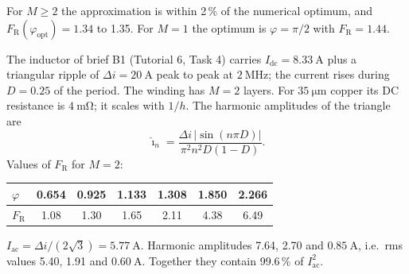
\begin{solutionblock}
	For $M\geq2$ the approximation is within 2\,\% of the numerical optimum, and $F_\mathrm{R}(\varphi_\mathrm{opt})=1.34$ to 1.35. For $M=1$ the optimum is $\varphi=\pi/2$ with $F_\mathrm{R}=1.44$.
\end{solutionblock}



The inductor of brief B1 (Tutorial 6, Task 4) carries $I_\mathrm{dc}=\SI{8.33}{\ampere}$ plus a triangular ripple of $\Delta i=\SI{20}{\ampere}$ peak to peak at $\SI{2}{\mega\hertz}$; the current rises during $D=0.25$ of the period. The winding has $M=2$ layers. For $\SI{35}{\micro\metre}$ copper its DC resistance is $\SI{4}{\milli\ohm}$; it scales with $1/h$. The harmonic amplitudes of the triangle are
\begin{equation}
	\hat{\imath}_n=\frac{\Delta i\,|\sin(n\pi D)|}{\pi^2n^2D(1-D)}.
\end{equation}
Values of $F_\mathrm{R}$ for $M=2$:

\begin{center}
	\begin{tabular}{|l|c|c|c|c|c|c|}
		\hline
		$\varphi$           & 0.654 & 0.925 & 1.133 & 1.308 & 1.850 & 2.266 \\
		\hline
		$F_\mathrm{R}$      & 1.08  & 1.30  & 1.65  & 2.11  & 4.38  & 6.49  \\
		\hline
	\end{tabular}
	\label{tab:ex07_fr2}
\end{center}


\begin{solutionblock}
	$I_\mathrm{ac}=\Delta i/(2\sqrt{3})=\SI{5.77}{\ampere}$. Harmonic amplitudes 7.64, 2.70 and $\SI{0.85}{\ampere}$, i.e.\ rms values 5.40, 1.91 and $\SI{0.60}{\ampere}$. Together they contain 99.6\,\% of $I_\mathrm{ac}^2$.
\end{solutionblock}


